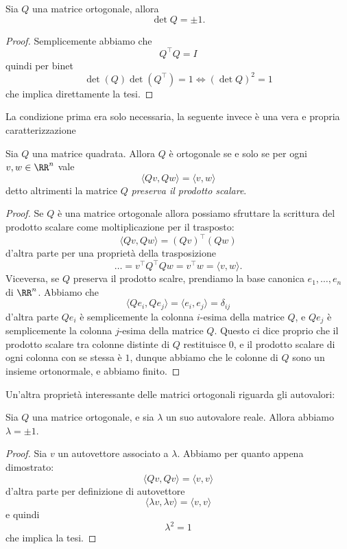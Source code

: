 \documentclass[11pt]{scrartcl}
\begin{document}
   	 \begin{lemma}
   	 	Sia $Q$ una matrice ortogonale, allora 
   	 	$$\det Q = \pm 1.$$
   	 \end{lemma}
   	 \begin{proof}
   	 	Semplicemente abbiamo che 
   	 	$$Q^\intercal Q = I$$
   	 	quindi per binet
   	 	$$\det ( Q)\det(Q^\intercal)=1 \iff \left(\det Q\right)^2=1$$
   	 	che implica direttamente la tesi.
   	 \end{proof}
   	 La condizione prima era solo necessaria, la seguente invece è una vera e propria caratterizzazione
   	 \begin{lemma}
   	 	Sia $Q$ una matrice quadrata. Allora $Q$ è ortogonale se e solo se per ogni $v,w\in\RR^n$ vale
   	 	$$\langle Qv,Qw\rangle = \langle v,w \rangle$$
   	 	detto altrimenti la matrice $Q$ \textit{preserva il prodotto scalare}.
   	 \end{lemma}
   	 \begin{proof}
   	 	Se $Q$ è una matrice ortogonale allora possiamo sfruttare la scrittura del prodotto scalare come moltiplicazione per il trasposto:
   	 	$$\langle Qv, Qw\rangle=\left(Qv\right)^\intercal \left(Qw\right)$$
   	 	d'altra parte per una proprietà della trasposizione
   	 	$$\dots=v^\intercal Q^\intercal Q w=v^\intercal w=\langle v,w\rangle.$$
   	 	Viceversa, se $Q$ preserva il prodotto scalre, prendiamo la base canonica $e_1,\dots,e_n$ di $\RR^n$. Abbiamo che
   	 	$$\langle Qe_i,Qe_j\rangle = \langle e_i,e_j \rangle =\delta_{ij}$$
   	 	d'altra parte $Qe_i$ è semplicemente la colonna $i$-esima della matrice $Q$, e $Qe_j$ è semplicemente la colonna $j$-esima della matrice $Q$. Questo ci dice proprio che il prodotto scalare tra colonne distinte di $Q$ restituisce $0$, e il prodotto scalare di ogni colonna con se stessa è $1$, dunque abbiamo che le colonne di $Q$ sono un insieme ortonormale, e abbiamo finito.
   	 \end{proof}
   	 Un'altra proprietà interessante delle matrici ortogonali riguarda gli autovalori:
   	 \begin{lemma}
   	 	Sia $Q$ una matrice ortogonale, e sia $\lambda$ un suo autovalore reale. Allora abbiamo $\lambda = \pm 1$.
   	 \end{lemma}
   	 \begin{proof}
   	 	Sia $v$ un autovettore associato a $\lambda$. Abbiamo per quanto appena dimostrato:
   	 	$$\langle Qv,Qv\rangle = \langle v,v\rangle $$
   	 	d'altra parte per definizione di autovettore 
   	 	$$\langle \lambda v,\lambda v \rangle = \langle v,v \rangle $$
   	 	e quindi 
   	 	$$\lambda^2 = 1$$
   	 	che implica la tesi.
   	 \end{proof}
\end{document}
